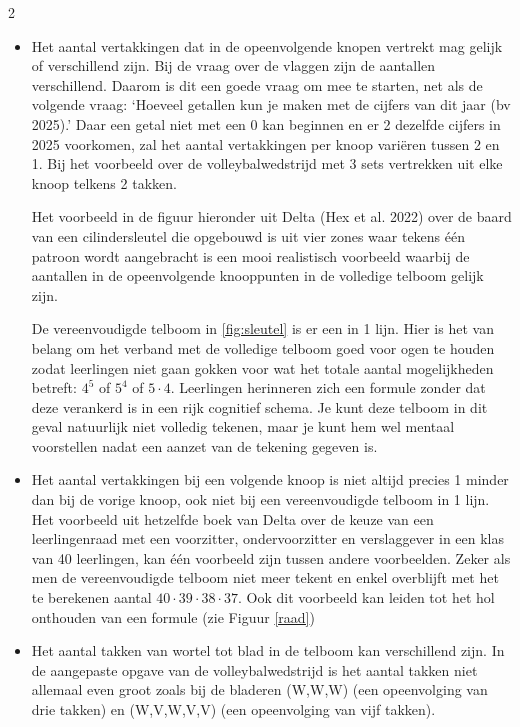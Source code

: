 \begin{multicols}{2}
\begin{itemize}
    \item Het aantal vertakkingen dat in de opeenvolgende knopen vertrekt mag gelijk of verschillend zijn. Bij de vraag over de vlaggen zijn de aantallen verschillend. Daarom is dit een goede vraag om mee te starten, net als de volgende vraag: ‘Hoeveel getallen kun je maken met de cijfers van dit jaar (bv 2025).’ Daar een getal niet met een 0 kan beginnen en er 2 dezelfde cijfers in 2025 voorkomen, zal het aantal vertakkingen per knoop variëren tussen 2 en 1. Bij het voorbeeld over de volleybalwedstrijd met 3 sets vertrekken uit elke knoop telkens 2 takken. 
    
    Het voorbeeld in de figuur hieronder uit Delta (Hex et al. 2022) over de baard van een cilindersleutel die opgebouwd is uit vier zones waar tekens één patroon wordt aangebracht is een mooi realistisch voorbeeld waarbij de aantallen in de opeenvolgende knooppunten in de volledige telboom gelijk zijn. 

    
    De vereenvoudigde telboom in \autoref{fig:sleutel} is er een in 1 lijn. Hier is het van belang om het verband met de volledige telboom goed voor ogen te houden zodat leerlingen niet gaan gokken voor wat het totale aantal mogelijkheden betreft: $4^5$ of $5^4$ of $5\cdot4$. Leerlingen herinneren zich een formule zonder dat deze verankerd is in een rijk cognitief schema. Je kunt deze telboom in dit geval natuurlijk niet volledig tekenen, maar je kunt hem wel mentaal voorstellen nadat een aanzet van de tekening gegeven is.
    
\item Het aantal vertakkingen bij een volgende knoop is niet altijd precies 1 minder dan bij de vorige knoop, ook niet bij een vereenvoudigde telboom in 1 lijn. Het voorbeeld uit hetzelfde boek van Delta over de keuze van een leerlingenraad  met een voorzitter, ondervoorzitter en verslaggever in een klas van 40 leerlingen, kan één voorbeeld zijn tussen andere  voorbeelden. Zeker als men de vereenvoudigde telboom niet meer tekent en enkel overblijft met het te berekenen aantal $40\cdot39\cdot38\cdot37$. Ook dit voorbeeld kan leiden tot het hol onthouden van een formule (zie Figuur
\autoref{raad})

\item Het aantal takken van wortel tot blad in de telboom kan verschillend zijn. In de aangepaste opgave van de volleybalwedstrijd is het aantal takken niet allemaal even groot zoals bij de bladeren (W,W,W) (een opeenvolging van drie takken) en (W,V,W,V,V) (een opeenvolging van vijf takken). 
\end{itemize}

\end{multicols}
